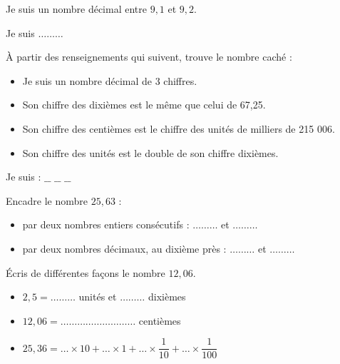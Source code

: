\begin{pageParcoursu} 


Je suis un nombre décimal entre  $9,1$ et $9,2$.\vspace{0.3cm}

Je suis $\ldots \ldots\ldots$




À partir des renseignements qui suivent, trouve le nombre caché :

\begin{itemize}
\item  Je suis un nombre décimal de 3 chiffres.
\item  Son chiffre des dixièmes est le même que celui de 67,25.
\item  Son chiffre des centièmes est le chiffre des unités de milliers de 215 006.
\item  Son chiffre des unités est le double de son chiffre dixièmes.
\end{itemize}
 
Je suis : $\_\_$ $\_\_$ $\_\_$ 
 

Encadre le nombre $25,63$ :

\begin{itemize}
\item par deux nombres entiers consécutifs : $\ldots\ldots\ldots$ et $\ldots\ldots\ldots$ \vspace{0.3cm}
\item par deux nombres décimaux, au dixième près : $\ldots\ldots\ldots$ et $\ldots\ldots\ldots$ \vspace{0.3cm}
\end{itemize} 
 
 

Écris de différentes façons le nombre $12,06$.

\begin{itemize}
\item $2,5 = \ldots\ldots\ldots$ unités et $\ldots\ldots\ldots$ dixièmes \vspace{0.3cm}
\item $12,06 =\ldots\ldots\ldots  \ldots\ldots\ldots \ldots\ldots\ldots$ centièmes\vspace{0.3cm}
\item $25,36 =\ldots\times 10 + \ldots\times 1 + \ldots\times \dfrac{1}{10} +  \ldots\times \dfrac{1}{100}$ 
\end{itemize}


\end{pageParcoursu}
